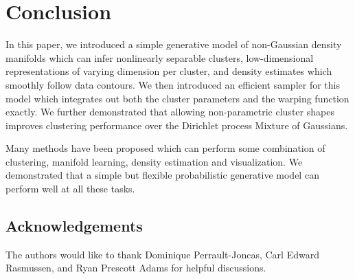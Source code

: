 \section{Conclusion}

In this paper, we introduced a simple generative model of non-Gaussian density manifolds which can infer nonlinearly separable clusters, low-dimensional representations of varying dimension per cluster, and density estimates which smoothly follow data contours.  We then introduced an efficient sampler for this model which integrates out both the cluster parameters and the warping function exactly.  We further demonstrated that allowing non-parametric cluster shapes improves clustering performance over the Dirichlet process Mixture of Gaussians.

Many methods have been proposed which can perform some combination of clustering, manifold learning, density estimation and visualization.
We demonstrated that a simple but flexible probabilistic generative model can perform well at all these tasks.




\subsection*{Acknowledgements}
The authors would like to thank Dominique Perrault-Joncas, Carl Edward Rasmussen, and Ryan Prescott Adams for helpful discussions.


\outbpdocument{


}


